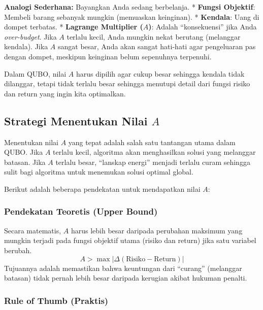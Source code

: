 \textbf{Analogi Sederhana:} Bayangkan Anda sedang berbelanja. * \textbf{Fungsi Objektif}: Membeli barang sebanyak mungkin (memuaskan keinginan). * \textbf{Kendala}: Uang di dompet terbatas. * \textbf{Lagrange Multiplier (\(A\))}: Adalah ``konsekuensi'' jika Anda \emph{over-budget}. Jika \(A\) terlalu kecil, Anda mungkin nekat berutang (melanggar kendala). Jika \(A\) sangat besar, Anda akan sangat hati-hati agar pengeluaran pas dengan dompet, meskipun keinginan belum sepenuhnya terpenuhi.

Dalam QUBO, nilai \(A\) harus dipilih agar cukup besar sehingga kendala tidak dilanggar, tetapi tidak terlalu besar sehingga menutupi detail dari fungsi risiko dan return yang ingin kita optimalkan.

\hypertarget{strategi-menentukan-nilai-a}{%
\subsection{\texorpdfstring{Strategi Menentukan Nilai \(A\)}{Strategi Menentukan Nilai A}}\label{strategi-menentukan-nilai-a}}

Menentukan nilai \(A\) yang tepat adalah salah satu tantangan utama dalam QUBO. Jika \(A\) terlalu kecil, algoritma akan menghasilkan solusi yang melanggar batasan. Jika \(A\) terlalu besar, ``lanskap energi'' menjadi terlalu curam sehingga sulit bagi algoritma untuk menemukan solusi optimal global.

Berikut adalah beberapa pendekatan untuk mendapatkan nilai \(A\):

\hypertarget{a.-pendekatan-teoretis-upper-bound}{%
\subsubsection{Pendekatan Teoretis (Upper Bound)}\label{a.-pendekatan-teoretis-upper-bound}}

Secara matematis, \(A\) harus lebih besar daripada perubahan maksimum yang mungkin terjadi pada fungsi objektif utama (risiko dan return) jika satu variabel berubah. \[ A > \max | \Delta (\text{Risiko} - \text{Return}) | \] Tujuannya adalah memastikan bahwa keuntungan dari ``curang'' (melanggar batasan) tidak pernah lebih besar daripada kerugian akibat hukuman penalti.

\hypertarget{b.-rule-of-thumb-praktis}{%
\subsubsection{Rule of Thumb (Praktis)}\label{b.-rule-of-thumb-praktis}}

